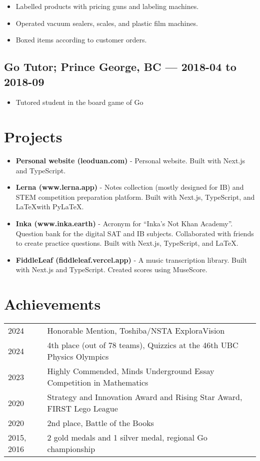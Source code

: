 \documentclass{article}
\begin{document}
\begin{itemize}
	\item Labelled products with pricing guns and labeling machines.
	\item Operated vacuum sealers, scales, and plastic film machines.
	\item Boxed items according to customer orders.
\end{itemize}

\subsection*{Go Tutor; Prince George, BC — 2018-04 to 2018-09}

\begin{itemize}
	\item Tutored student in the board game of Go
\end{itemize}

\section*{Projects}

\begin{itemize}
	\item \textbf{Personal website (leoduan.com)} - Personal website. Built with Next.js and TypeScript.
	\item \textbf{Lerna (www.lerna.app)} - Notes collection (mostly designed for IB) and STEM competition preparation platform. Built with Next.js, TypeScript, and \LaTeX with PyLaTeX.
	\item \textbf{Inka (www.inka.earth)} - Acronym for ``Inka's Not Khan Academy''. Question bank for the digital SAT and IB subjects. Collaborated with friends to create practice questions. Built with Next.js, TypeScript, and \LaTeX.
	\item \textbf{FiddleLeaf (fiddleleaf.vercel.app)} - A music transcription library. Built with Next.js and TypeScript. Created scores using MuseScore.
\end{itemize}

\section*{Achievements}

\begin{tabular}{@{}ll}
	2024       & Honorable Mention, Toshiba/NSTA ExploraVision                          \\
	2024       & 4th place (out of 78 teams), Quizzics at the 46th UBC Physics Olympics \\
	2023       & Highly Commended, Minds Underground Essay Competition in Mathematics   \\
	2020       & Strategy and Innovation Award and Rising Star Award, FIRST Lego League \\
	2020       & 2nd place, Battle of the Books                                         \\
	2015, 2016 & 2 gold medals and 1 silver medal, regional Go championship
\end{tabular}
\end{document}
